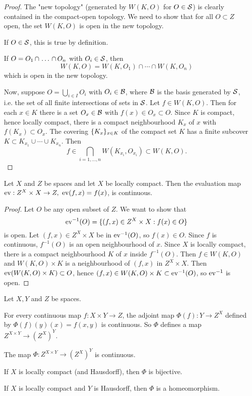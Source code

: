 \begin{proof}
The "new topology" (generated by $W(K,O)$ for $O\in\S$) is clearly contained in the compact-open topology. We need to show that for all $O\subset Z$ open, the set $W(K,O)$ is open in the new topology.

If $O\in\S$, this is true by definition.

If $O=\nns{O}{\cap}{n}$ with $O_i\in\S$, then
\[W(K,O)=W(K,O_1)\cap\cdots\cap W(K,O_n)\]
which is open in the new topology.

Now, suppose $O=\bigcup_{i\in I}O_i$ with $O_i\in\Bb$, where $\Bb$ is the basis generated by $\S$, i.e. the set of all finite intersections of sets in $\S$. Let $f\in W(K,O)$. Then for each $x\in K$ there is a set $O_x\in\Bb$ with $f(x)\in O_x\subset O$. Since $K$ is compact, hence locally compact, there is a compact neighbourhood $K_x$ of $x$ with $f(K_x)\subset O_x$. The covering $\cb{K_x}_{x\in K}$ of the compact set $K$ has a finite subcover $K\subset K_{x_1}\cup\cdots\cup K_{x_n}$. Then
\[f\in \bigcap_{i=1,\dots,n}W(K_{x_i},O_{x_i})\subset W(K,O).\]
\end{proof}

\begin{theorem}
Let $X$ and $Z$ be spaces and let $X$ be locally compact. Then the evaluation map $\ev:Z^X\times X\to Z,\ \ev(f,x)=f(x)$, is continuous.
\end{theorem}

\begin{proof}
Let $O$ be any open subset of $Z$. We want to show that
\[\ev^{-1}(O)=\cb{(f,x)\in Z^X\times X:f(x)\in O}\]
is open. Let $(f,x)\in Z^X\times X$ be in $\ev^{-1}(O)$, so $f(x)\in O$. Since $f$ is continuous, $f^{-1}(O)$ is an open neighbourhood of $x$. Since $X$ is locally compact, there is a compact neighbourhood $K$ of $x$ inside $f^{-1}(O)$. Then $f\in W(K,O)$ and $W(K,O)\times K$ is a neighbourhood of $(f,x)$ in $Z^X\times X$. Then $\ev(W(K,O)\times K)\subset O$, hence $(f,x)\in W(K,O)\times K\subset\ev^{-1}(O)$, so $\ev^{-1}$ is open.
\end{proof}

\begin{theorem}
Let $X,Y$ and $Z$ be spaces.
\begin{numerate}
    \setcounter{enumi}{-1}
    \item For every continuous map $f:X\times Y\to Z$, the adjoint map $\Phi(f):Y\to Z^X$ defined by $\Phi(f)(y)(x)=f(x,y)$ is continuous. So $\Phi$ defines a map $Z^{X\times Y}\to(Z^X)^Y$.
    \item The map $\Phi:Z^{X\times Y}\to(Z^X)^Y$ is continuous.
    \item If $X$ is locally compact (and Hausdorff), then $\Phi$ is bijective.
    \item If $X$ is locally compact and $Y$ is Hausdorff, then $\Phi$ is a homeomorphism.
\end{numerate}
\end{theorem}

